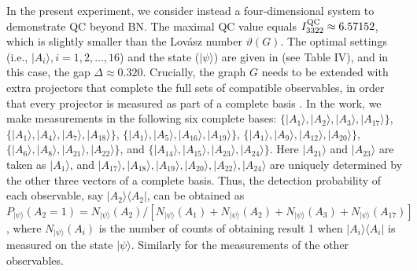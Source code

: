 \documentclass[prl,letterpaper,english,reprint,nofootinbib,aps,superscriptaddress,showpacs,showkeys]{revtex4-1}
\theoremstyle{definition}
\theoremstyle{remark}
\begin{document}
In the present experiment, we consider instead a four-dimensional system to demonstrate QC beyond BN. The maximal QC value equals $I_{3322}^{\rm QC}\approx6.57152$, which is slightly smaller than the Lov\'asz number $\vartheta(G)$. The optimal settings (i.e., $|A_i\rangle, i=1,2,...,16$) and the state ($|\psi\rangle$) are given in \cite{SM} (see Table IV), and in this case, the gap $\Delta\approx 0.320$.
Crucially, the graph $G$ needs to be extended with extra projectors that complete the full sets of compatible observables, in order that every projector is measured as part of a complete basis \cite{yxiao17}. In the work, we make measurements in the following six complete bases: $\{|A_1\rangle,|A_2\rangle,|A_3\rangle,|A_{17}\rangle\}$,
$\{|A_1\rangle,|A_4\rangle,|A_7\rangle,|A_{18}\rangle\}$, $\{|A_1\rangle,|A_{5}\rangle,|A_{16}\rangle,|A_{19}\rangle\}$,
$\{|A_1\rangle,|A_{9}\rangle,|A_{12}\rangle,|A_{20}\rangle\}$, $\{|A_{6}\rangle,|A_{8}\rangle,|A_{21}\rangle,|A_{22}\rangle\}$, and $\{|A_{14}\rangle,|A_{15}\rangle,|A_{23}\rangle,|A_{24}\rangle\}$.
 Here  $|A_{21}\rangle$ and $|A_{23}\rangle$ are taken as $|A_{1}\rangle$, and $|A_{17}\rangle,|A_{18}\rangle,|A_{19}\rangle,|A_{20}\rangle,|A_{22}\rangle,|A_{24}\rangle$ are uniquely determined by the other three vectors of a complete basis.
 Thus, the detection probability of each observable, say $|A_{2}\rangle\langle A_{2}|$, can be obtained as $P_{|\psi\rangle}(A_2=1)=
{N_{|\psi\rangle}(A_2)}/[N_{|\psi\rangle}(A_1)+N_{|\psi\rangle}(A_2)+N_{|\psi\rangle}(A_3)+N_{|\psi\rangle}(A_{17})]$,
where $N_{|\psi\rangle}(A_i)$ is the number of counts of obtaining result 1 when $|A_{i}\rangle\langle A_{i}|$ is measured on the state $|\psi\rangle.$ Similarly for the measurements of the other observables.
\end{document}
